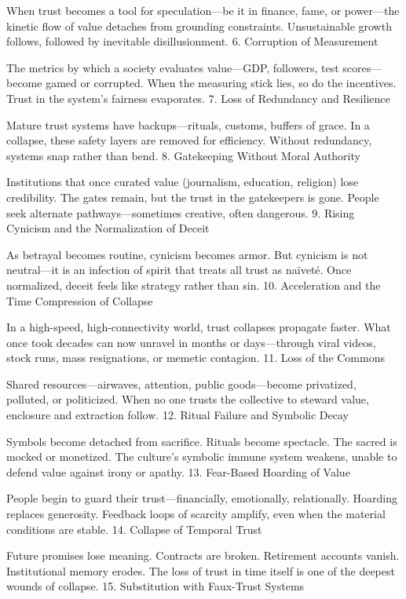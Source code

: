 \documentclass[11pt,oneside]{book}
\begin{document}
When trust becomes a tool for speculation—be it in finance, fame, or power—the kinetic flow of value detaches from grounding constraints. Unsustainable growth follows, followed by inevitable disillusionment.
6. Corruption of Measurement

The metrics by which a society evaluates value—GDP, followers, test scores—become gamed or corrupted. When the measuring stick lies, so do the incentives. Trust in the system’s fairness evaporates.
7. Loss of Redundancy and Resilience

Mature trust systems have backups—rituals, customs, buffers of grace. In a collapse, these safety layers are removed for efficiency. Without redundancy, systems snap rather than bend.
8. Gatekeeping Without Moral Authority

Institutions that once curated value (journalism, education, religion) lose credibility. The gates remain, but the trust in the gatekeepers is gone. People seek alternate pathways—sometimes creative, often dangerous.
9. Rising Cynicism and the Normalization of Deceit

As betrayal becomes routine, cynicism becomes armor. But cynicism is not neutral—it is an infection of spirit that treats all trust as naïveté. Once normalized, deceit feels like strategy rather than sin.
10. Acceleration and the Time Compression of Collapse

In a high-speed, high-connectivity world, trust collapses propagate faster. What once took decades can now unravel in months or days—through viral videos, stock runs, mass resignations, or memetic contagion.
11. Loss of the Commons

Shared resources—airwaves, attention, public goods—become privatized, polluted, or politicized. When no one trusts the collective to steward value, enclosure and extraction follow.
12. Ritual Failure and Symbolic Decay

Symbols become detached from sacrifice. Rituals become spectacle. The sacred is mocked or monetized. The culture’s symbolic immune system weakens, unable to defend value against irony or apathy.
13. Fear-Based Hoarding of Value

People begin to guard their trust—financially, emotionally, relationally. Hoarding replaces generosity. Feedback loops of scarcity amplify, even when the material conditions are stable.
14. Collapse of Temporal Trust

Future promises lose meaning. Contracts are broken. Retirement accounts vanish. Institutional memory erodes. The loss of trust in time itself is one of the deepest wounds of collapse.
15. Substitution with Faux-Trust Systems
\end{document}
